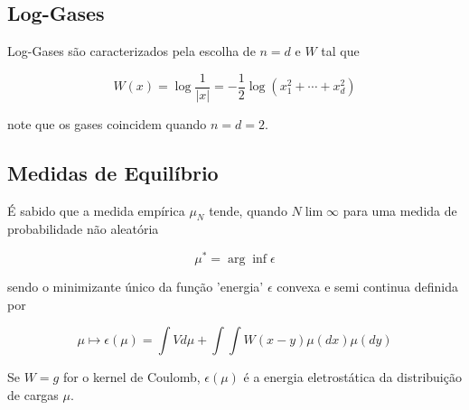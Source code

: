 \subsection{Log-Gases}

Log-Gases são caracterizados pela escolha de $n=d$ e $W$ tal que

\[
W(x) = \log \frac{1}{|x|} = - \frac{1}{2} \log(x_1^2 + \cdots + x_d^2)
\]

note que os gases coincidem quando $n=d=2$.

\subsection{Medidas de Equilíbrio}

É sabido que a medida empírica $\mu_N$ tende, quando $N \lim \infty$ para uma medida de probabilidade não aleatória

\[
\mu^* = \arg \inf {\epsilon}
\]

sendo o minimizante único da função 'energia' $\epsilon$ convexa e semi continua definida por

\[
\mu \mapsto \epsilon(\mu) = \int V d\mu + \int \int W(x-y) \mu(dx) \mu(dy)
\]

Se $W = g$ for o kernel de Coulomb, $\epsilon(\mu)$  é a energia  eletrostática da distribuição de cargas $\mu$.



